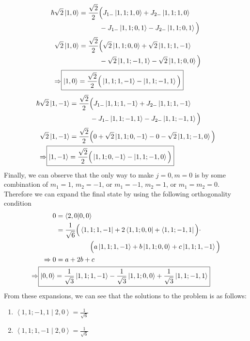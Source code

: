 \documentclass[a4paper, 11pt]{article}
\newcommand{\bra}[1]{\ensuremath{\left\langle#1\right|}}
\newcommand{\ket}[1]{\ensuremath{\left|#1\right\rangle}}
\newcommand{\bracket}[2]{\ensuremath{\left\langle #1 \middle| #2 \right\rangle}}
\newenvironment{solution}{%
	\begin{list}{}{%
			\setlength{\topsep}{0pt}%
			\setlength{\leftmargin}{0.5cm}%
			\setlength{\rightmargin}{0.5cm}%
			\setlength{\listparindent}{\parindent}%
			\setlength{\itemindent}{\parindent}%
			\setlength{\parsep}{\parskip}%
		}%
		\item[]}{\end{list}}
\begin{document}
\begin{enumerate}[leftmargin=0em]
\begin{solution}
\begin{align}
        \hbar\sqrt{2}\ket{1,0}&= \frac{\sqrt{2}}{2}\Big( J_{1-}\ket{1,1;1,0}+J_{2-}\ket{1,1;1,0}\\
                              &\qquad\quad - J_{1-}\ket{1,1;0,1} - J_{2-}\ket{1,1;0,1}\Big)\notag\\
        \sqrt{2}\ket{1,0}&= \frac{\sqrt{2}}{2}\Big( \sqrt{2}\ket{1,1;0,0}+\sqrt{2}\ket{1,1;1,-1} \\
                              &\qquad\quad -\sqrt{2}\ket{1,1;-1,1}-\sqrt{2}\ket{1,1;0,0}\Big)\notag \\
        \Rightarrow \Aboxed{\ket{1,0}&= \frac{\sqrt{2}}{2}\Big(\ket{1,1;1,-1}-\ket{1,1;-1,1}\Big)  }
      \end{align}
      \begin{align}
        \hbar\sqrt{2}\ket{1,-1} &= \frac{\sqrt{2}}{2}\Big(J_{1-}\ket{1,1;1,-1}+J_{2-}\ket{1,1;1,-1}\\
                                &\qquad\quad -J_{1-}\ket{1,1;-1,1}-J_{2-}\ket{1,1;-1,1}\Big)\notag\\
        \sqrt{2}\ket{1,-1} &= \frac{\sqrt{2}}{2}\Big(0+\sqrt{2}\ket{1,1;0,-1} - 0 -\sqrt{2}\ket{1,1;-1,0}  \Big)\\
        \Rightarrow \Aboxed{\ket{1,-1} &= \frac{\sqrt{2}}{2}\Big(\ket{1,1;0,-1}-\ket{1,1;-1,0}\Big)}
      \end{align}
      Finally, we can observe that the only way to make $j=0, m=0$ is by
      some combination of $m_1=1$, $m_2=-1$, or $m_1=-1$, $m_2=1$, or
      $m_1=m_2=0$. Therefore we can expand the final state by using the
      following orthogonality condition
      \begin{align}
        0 &= \bracket{2,0}{0,0} \\
          &= \frac{1}{\sqrt{6}}\Big(\bra{1,1;1,-1}+2\bra{1,1;0,0}+\bra{1,1;-1,1}\Big)\cdot \\
          &\qquad\qquad\quad \Big(a\ket{1,1;1,-1}+b\ket{1,1;0,0}+c\ket{1,1;1,-1}\Big)\notag \\
        \Rightarrow 0 &= a+2b+c \\
        \Rightarrow \Aboxed{\ket{0,0}&= \frac{1}{\sqrt{3}}\ket{1,1;1,-1}-\frac{1}{\sqrt{3}}\ket{1,1;0,0}+\frac{1}{\sqrt{3}}\ket{1,1;-1,1}}
      \end{align}
     From these expansions, we can see that the solutions to the problem is as
     follows:
     \begin{enumerate}[leftmargin=3em, label=(\alph*)]
     \item $\bracket{1,1;-1,1}{2,0}= \frac{1}{\sqrt{6}}$
     \item $\bracket{1,1;1,-1}{2,0}= \frac{1}{\sqrt{6}}$

\end{enumerate}
\end{solution}
\end{enumerate}
\end{document}
